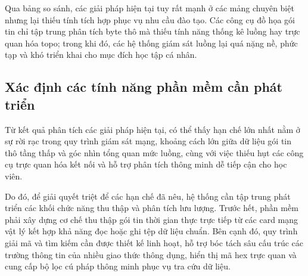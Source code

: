 \documentclass[../DoAn.tex]{subfiles}
\begin{document}
\begin{table}[H]
\centering
\caption{Bảng so sánh tính năng giữa các giải pháp hiện có và đồ án đề xuất}
\label{tab:so_sanh_cong_cu}
\end{table}

Qua bảng so sánh, các giải pháp hiện tại tuy rất mạnh ở các mảng chuyên biệt nhưng lại thiếu tính tích hợp phục vụ nhu cầu đào tạo. Các công cụ đồ họa gói tin chỉ tập trung phân tích byte thô mà thiếu tính năng thống kê luồng hay trực quan hóa topo; trong khi đó, các hệ thống giám sát luồng lại quá nặng nề, phức tạp và khó triển khai cho mục đích học tập cá nhân.

\subsection{Xác định các tính năng phần mềm cần phát triển}
Từ kết quả phân tích các giải pháp hiện tại, có thể thấy hạn chế lớn nhất nằm ở sự rời rạc trong quy trình giám sát mạng, khoảng cách lớn giữa dữ liệu gói tin thô tầng thấp và góc nhìn tổng quan mức luồng, cùng với việc thiếu hụt các công cụ trực quan hóa kết nối và hỗ trợ phân tích thông minh dễ tiếp cận cho học viên.

Do đó, để giải quyết triệt để các hạn chế đã nêu, hệ thống cần tập trung phát triển các khối chức năng thu thập và phân tích lưu lượng. Trước hết, phần mềm phải xây dựng cơ chế thu thập gói tin thời gian thực trực tiếp từ các card mạng vật lý kết hợp khả năng đọc hoặc ghi tệp dữ liệu chuẩn. Bên cạnh đó, quy trình giải mã và tìm kiếm cần được thiết kế linh hoạt, hỗ trợ bóc tách sâu cấu trúc các trường thông tin của nhiều giao thức thông dụng, hiển thị mã hex trực quan và cung cấp bộ lọc cú pháp thông minh phục vụ tra cứu dữ liệu.
\end{document}
